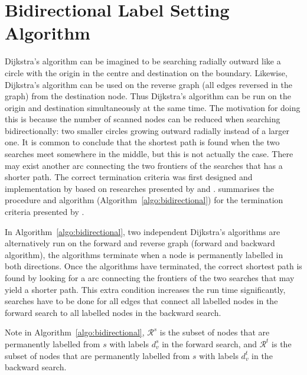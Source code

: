 \section{Bidirectional Label Setting Algorithm} \label{section:bidirectional}
Dijkstra's algorithm can be imagined to be searching radially outward like a circle with the origin in the centre and destination on the boundary.
Likewise, Dijkstra's algorithm can be used on the reverse graph (all edges reversed in the graph) from the destination node.
Thus Dijkstra's algorithm can be run on the origin and destination simultaneously at the same time.
The motivation for doing this is because the number of scanned nodes can be reduced when searching bidirectionally:
two smaller circles growing outward radially instead of a larger one.
It is common to conclude that the shortest path is found when the two searches meet somewhere in the middle,
but this is not actually the case.
There may exist another arc connecting the two frontiers of the searches that has a shorter path.
The correct termination criteria was first designed and implementation by \citet{Pohl} based on researches presented by \citet{Dantzig, Nicholson} and \citet{Dreyfus}.
\citet{Klunder} summarises the procedure and algorithm (Algorithm~\ref{algo:bidirectional}) for the termination criteria presented by \citet{Pohl}.

In Algorithm~\ref{algo:bidirectional},
two independent Dijkstra's algorithms are alternatively run on the forward  and reverse graph (forward and backward algorithm),
the algorithms terminate when a node is permanently labelled in both directions.
Once the algorithms have terminated,
the correct shortest path is found by looking for a arc connecting the frontiers of the two searches that may yield a shorter path.
This extra condition increases the run time significantly, 
searches have to be done for all edges that connect all labelled nodes in the forward search to all labelled nodes in the backward search.

Note in Algorithm~\ref{algo:bidirectional},
$\mathcal{R}^s$ is the subset of nodes that are permanently labelled from $s$ with labels $d_v^s$ in the forward search, and 
$\mathcal{R}^t$ is the subset of nodes that are permanently labelled from $s$ with labels $d_v^t$ in the backward search.

